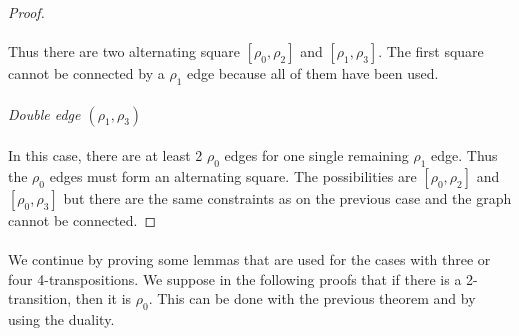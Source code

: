 \begin{proof}
\begin{figure}[H]
\begin{center}
      \caption{}
    \end{center}
  \end{figure}

  \paragraph{}
  Thus there are two alternating square $[\rho_0, \rho_2]$ and $[\rho_1, \rho_3]$. The first square cannot be connected by a $\rho_1$ edge because all of them have been used.

  \paragraph{}
  \textit{Double edge $(\rho_1, \rho_3)$}

  \paragraph{}
  In this case, there are at least 2 $\rho_0$ edges for one single remaining $\rho_1$ edge. Thus the $\rho_0$ edges must form an alternating square. The possibilities are $[\rho_0, \rho_2]$ and $[\rho_0, \rho_3]$ but there are the same constraints as on the previous case and the graph cannot be connected.

\end{proof}

\paragraph{}
We continue by proving some lemmas that are used for the cases with three or four 4-transpositions. We suppose in the following proofs that if there is a 2-transition, then it is $\rho_0$. This can be done with the previous theorem and by using the duality.


